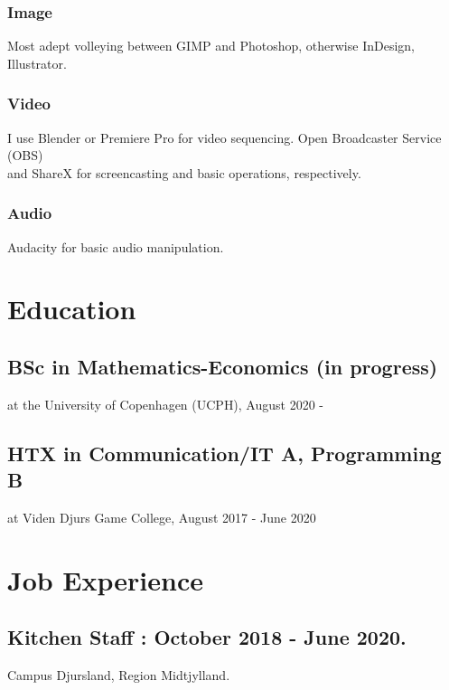 \documentclass[12]{article}
\begin{document}
\subsubsection{Image}

Most adept volleying between GIMP and Photoshop, otherwise InDesign, Illustrator.

\subsubsection{Video}

I use Blender or Premiere Pro for video sequencing. Open Broadcaster Service (OBS) \\ and ShareX for screencasting and basic operations, respectively.

\subsubsection{Audio}

Audacity for basic audio manipulation.

\section{Education}

\subsection{BSc in  Mathematics-Economics (in progress)}

at the University of Copenhagen (UCPH), August 2020 - 

\subsection{HTX in Communication/IT A, Programming B}
at Viden Djurs Game College, August 2017 - June 2020

\section{Job Experience}

\subsection{Kitchen Staff : October 2018 - June 2020.}

Campus Djursland, Region Midtjylland.
\end{document}
